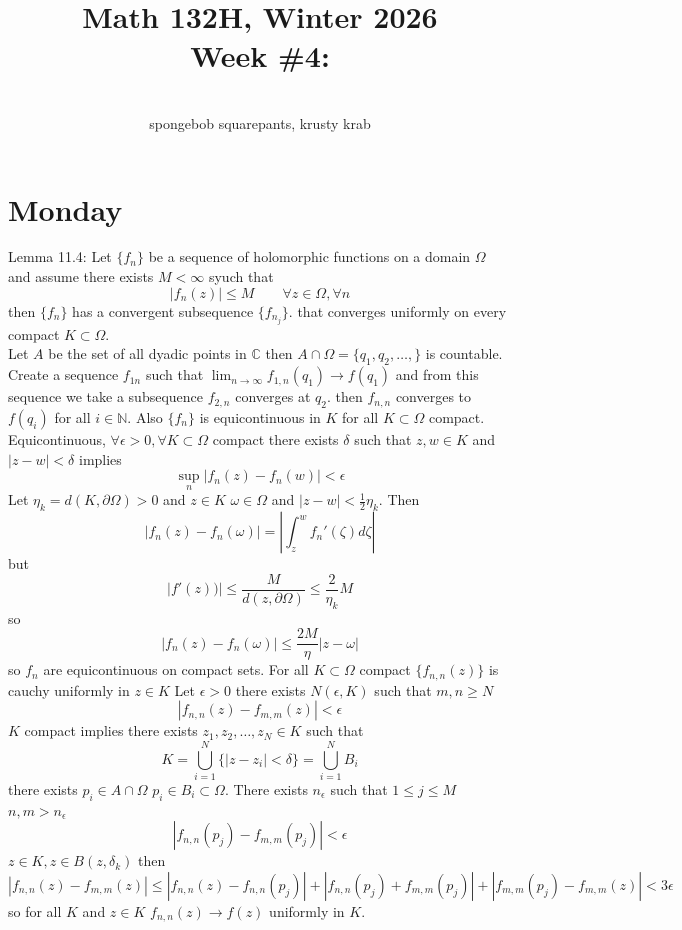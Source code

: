 \documentclass[11pt]{article}
\newcommand{\cnum}{Math 132H}
\newcommand{\ced}{Winter 2026}
\newcommand{\ctitle}[4]{\title{\vspace{-0.5in}\cnum, \ced\\Week #1: #2}\author{\vspace{-0.35in}\\#3, #4}}
\begin{document}
\ctitle{\#4}{}{spongebob squarepants}{krusty krab}
\date{}
\maketitle
\section{Monday}
Lemma 11.4:
Let $\{f_n\}$ be a sequence of holomorphic functions on a domain  $\Omega$ and assume there exists  $M < \infty$ syuch that
\[
|f_n(z)| \le M \qquad \forall z \in \Omega, \forall n
\] 
then $\{f_n\}$ has a convergent subsequence $\{f_{n_j}\}$. that converges uniformly on every compact $K \subset \Omega$.\\
Let $A$ be the  set of all dyadic points in $ \mathbb{C}$ then $A \cap \Omega = \{q_1,q_2,\dots,\}$ is countable. 
Create a sequence $f_{1n}$ such that  $\lim_{n\to \infty}f_{1,n}(q_1) \to f(q_1)$ and from this sequence we take a subsequence $f_{2,n}$ converges at $q_2$. then $f_{n,n}$ converges to  $f(q_i)$ for all  $i \in \mathbb{N}$.
Also $\{f_n\}$ is equicontinuous in  $K$ for all $K \subset \Omega$ compact.\\
Equicontinuous, $\forall \epsilon > 0, \forall K \subset \Omega$ compact there exists $\delta$ such that $z,w \in K$ and  $|z-w| < \delta$ implies
\[
\sup_n |f_n(z) - f_n(w)| < \epsilon
\] 
Let $\eta_k = d(K, \partial \Omega) > 0$ and $z \in K$  $\omega \in \Omega$ and  $|z-w| < \frac{1}{2}\eta_k$.
Then
\[
|f_n(z) - f_n(\omega)| = | \int_{ z}^{w}f_n'(\zeta) d\zeta|
\] 
but
\[
|f'(z)) |  \le \frac{M}{d(z, \partial \Omega)} \le \frac{2}{\eta_k}M
\] 
so
\[
|f_n(z) - f_n(\omega)| \le \frac{2M}{\eta}|z-\omega| 
\] 
so $f_n$ are equicontinuous on compact sets.
For all  $K \subset \Omega$ compact $\{f_{n,n}(z)\}$ is cauchy uniformly in  $z \in K$ Let  $\epsilon > 0$
there exists $N(\epsilon,K)$ such that $m,n \ge N$
 \[
     |f_{n,n}(z) - f_{m,m}(z)| < \epsilon
\] 
$K$ compact implies there exists $z_1,z_2,\dots,z_N \in K$ such that
\[
    K = \bigcup_{i=1}^{N}\{|z-z_i| < \delta\} = \bigcup_{i=1}^{N}B_i
\] 
there exists $p_i \in A \cap \Omega$ $p_i \in B_i \subset \Omega$. There exists $n_\epsilon$ such that $1 \le j \le M$
$n,m > n_\epsilon$ 
\[
 |f_{n,n}(p_j) -  f_{m,m}(p_j)| < \epsilon
\] 
$z \in K, z \in B(z,\delta_k)$ then
\[
 |f_{n,n}(z) - f_{m,m}(z)| \le |f_{n,n}(z) - f_{n,n}(p_j)| + |f_{n,n}(p_j) + f_{m,m}(p_j)| + |f_{m,m}(p_j) - f_{m,m}(z)| < 3\epsilon
\] 
so for all $K$ and  $z \in K$ $f_{n,n}(z) \to f(z)$ uniformly in  $K$.\\
\end{document}
